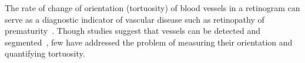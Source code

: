 \label{s:review_orientation_retinography}
%
The rate of change of orientation (tortuosity) of blood vessels in a retinogram can serve as a diagnostic indicator of vascular disease such as retinopathy of prematurity~\cite{Wallace_TAOS07,Hart_etal_IJMI99}. Though studies suggest that vessels can be detected and segmented~\cite{Staal_etal_TMI04,Ricci_Perfetti_TMI07}, few have addressed the problem of measuring their orientation and quantifying tortuosity.
